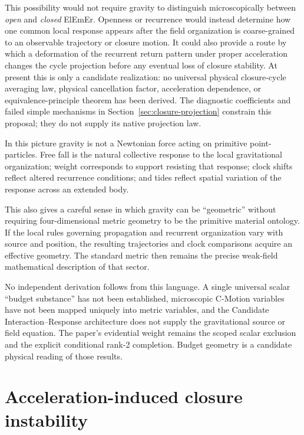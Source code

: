 \documentclass[11pt]{article}
\newcommand{\cmotion}{\mbox{C-Motion}}
\theoremstyle{plain}
\theoremstyle{remark}
\begin{document}
This possibility would not require gravity to distinguish microscopically between
\emph{open} and \emph{closed} ElEmEr.  Openness or recurrence would instead determine how one
common local response appears after the field organization is coarse-grained to an
observable trajectory or closure motion.  It could also provide a route by which a
deformation of the recurrent return pattern under proper acceleration changes the
cycle projection before any eventual loss of closure stability.  At present this is
only a candidate realization: no universal physical closure-cycle averaging law,
physical cancellation factor, acceleration dependence, or equivalence-principle
theorem has been derived.  The diagnostic coefficients and failed simple
mechanisms in Section~\ref{sec:closure-projection} constrain this proposal;
they do not supply its native projection law.


In this picture gravity is not a Newtonian force acting on primitive point-particles.
Free fall is the natural collective response to the local gravitational organization;
weight corresponds to support resisting that response; clock shifts reflect altered
recurrence conditions; and tides reflect spatial variation of the response across an
extended body.

This also gives a careful sense in which gravity can be ``geometric'' without requiring
four-dimensional metric geometry to be the primitive material ontology.  If the local
rules governing propagation and recurrent organization vary with source and position,
the resulting trajectories and clock comparisons acquire an effective geometry.  The
standard metric then remains the precise weak-field mathematical description of that
sector.

No independent derivation follows from this language.  A single universal scalar
``budget substance'' has not been established, microscopic \cmotion{} variables have not
been mapped uniquely into metric variables, and the Candidate Interaction--Response
architecture does not supply the gravitational source or field equation.  The paper's
evidential weight remains the scoped scalar exclusion and the explicit conditional
rank-2 completion.  Budget geometry is a candidate physical reading of those results.

\section{Acceleration-induced closure instability}
\label{sec:acceleration}
\end{document}
